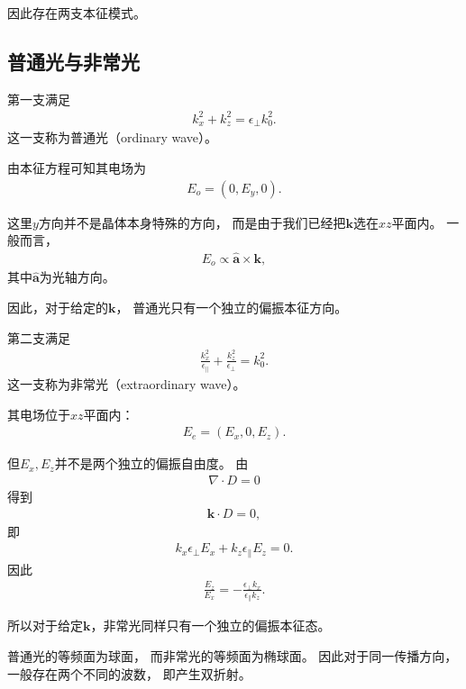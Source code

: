 \documentclass{article}
\begin{document}
因此存在两支本征模式。

\subsection{普通光与非常光}

第一支满足
\begin{align}
    \boxed{
    k_x^2+k_z^2
    =
    \epsilon_\perp k_0^2
    }.
\end{align}
这一支称为普通光（ordinary wave）。

由本征方程可知其电场为
\begin{align}
    \boxed{
    E_o=(0,E_y,0)
    }.
\end{align}

这里$y$方向并不是晶体本身特殊的方向，
而是由于我们已经把$\mathbf k$选在$xz$平面内。
一般而言，
\begin{align}
    \boxed{
    E_o\propto
    \hat{\mathbf a}\times\mathbf k
    },
\end{align}
其中$\hat{\mathbf a}$为光轴方向。

因此，对于给定的$\mathbf k$，
普通光只有一个独立的偏振本征方向。

第二支满足
\begin{align}
    \boxed{
    \frac{k_x^2}{\epsilon_\parallel}
    +
    \frac{k_z^2}{\epsilon_\perp}
    =
    k_0^2
    }.
\end{align}
这一支称为非常光（extraordinary wave）。

其电场位于$xz$平面内：
\begin{align}
    E_e=(E_x,0,E_z).
\end{align}

但$E_x,E_z$并不是两个独立的偏振自由度。
由
\begin{align}
    \nabla\cdot D=0
\end{align}
得到
\begin{align}
    \mathbf k\cdot D=0,
\end{align}
即
\begin{align}
    k_x\epsilon_\perp E_x
    +
    k_z\epsilon_\parallel E_z
    =0.
\end{align}
因此
\begin{align}
    \boxed{
    \frac{E_z}{E_x}
    =
    -\frac{\epsilon_\perp k_x}
    {\epsilon_\parallel k_z}
    }.
\end{align}

所以对于给定$\mathbf k$，非常光同样只有一个独立的偏振本征态。

普通光的等频面为球面，
而非常光的等频面为椭球面。
因此对于同一传播方向，一般存在两个不同的波数，
即产生双折射。
\end{document}

